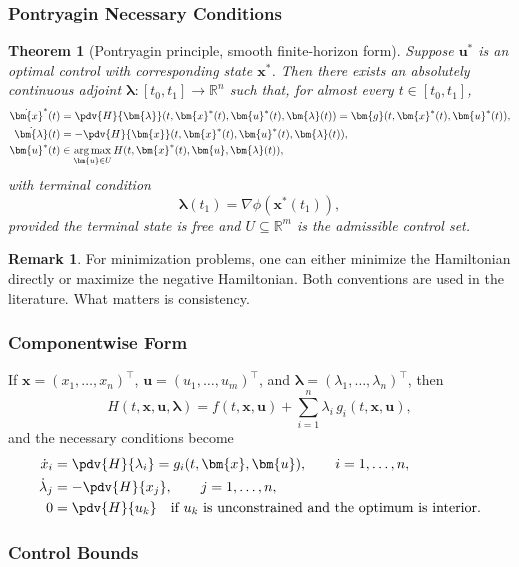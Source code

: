 \documentclass[11pt]{article}
\newtheorem{theorem}{Theorem}
\theoremstyle{definition}
\newtheorem{remark}{Remark}
\newcommand{\R}{\mathbb{R}}
\newcommand{\x}{\bm{x}}
\newcommand{\uvec}{\bm{u}}
\newcommand{\lam}{\bm{\lambda}}
\newcommand{\gvec}{\bm{g}}
\newcommand{\argmax}{\operatorname*{arg\,max}}
\begin{document}
\subsubsection{Pontryagin Necessary Conditions}

\begin{theorem}[Pontryagin principle, smooth finite-horizon form]
Suppose $\uvec^*$ is an optimal control with corresponding state $\x^*$. Then there exists an absolutely continuous adjoint $\lam:[t_0,t_1]\to\R^n$ such that, for almost every $t\in[t_0,t_1]$,
\begin{align}
\dot{\x}^*(t) &= \pdv{H}{\lam}(t,\x^*(t),\uvec^*(t),\lam(t))
= \gvec(t,\x^*(t),\uvec^*(t)), \\
\dot{\lam}(t) &= -\pdv{H}{\x}(t,\x^*(t),\uvec^*(t),\lam(t)), \\
\uvec^*(t) &\in \argmax_{\uvec\in U} H(t,\x^*(t),\uvec,\lam(t)),
\end{align}
with terminal condition
\begin{equation}
\lam(t_1)=\nabla \phi(\x^*(t_1)),
\end{equation}
provided the terminal state is free and $U\subseteq\R^m$ is the admissible control set.
\end{theorem}

\begin{remark}
For minimization problems, one can either minimize the Hamiltonian directly or maximize the negative Hamiltonian. Both conventions are used in the literature. What matters is consistency.
\end{remark}

\subsubsection{Componentwise Form}

If $\x=(x_1,\dots,x_n)^\top$, $\uvec=(u_1,\dots,u_m)^\top$, and $\lam=(\lambda_1,\dots,\lambda_n)^\top$, then
\[
H(t,\x,\uvec,\lam)
=
f(t,\x,\uvec)+\sum_{i=1}^{n}\lambda_i\,g_i(t,\x,\uvec),
\]
and the necessary conditions become
\begin{align}
\dot{x}_i &= \pdv{H}{\lambda_i}=g_i(t,\x,\uvec), \qquad i=1,\dots,n, \\
\dot{\lambda}_j &= -\pdv{H}{x_j}, \qquad j=1,\dots,n, \\
0 &= \pdv{H}{u_k} \quad \text{if } u_k \text{ is unconstrained and the optimum is interior}.
\end{align}

\subsubsection{Control Bounds}
\end{document}
